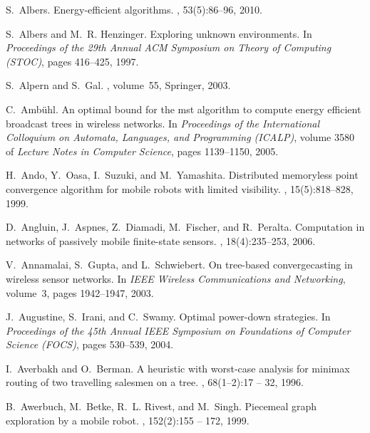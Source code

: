 \documentclass{article}
\begin{document}
\begin{thebibliography}{10}

S.~Albers.
\newblock Energy-efficient algorithms.
, 53(5):86--96, 2010.

S.~Albers and M.~R. Henzinger.
\newblock Exploring unknown environments.
\newblock In {\em Proceedings of the 29th Annual ACM Symposium on
  Theory of Computing (STOC)}, pages 416--425, 1997.

S.~Alpern and S.~Gal.
, volume~55,
\newblock Springer, 2003.

C.~Ambühl.
\newblock An optimal bound for the mst algorithm to compute energy efficient
  broadcast trees in wireless networks.
\newblock In {\em Proceedings of the International Colloquium on Automata, Languages, and
  Programming (ICALP)}, volume 3580 of {\em Lecture Notes in Computer Science},
  pages 1139--1150, 2005.

H.~Ando, Y.~Oasa, I.~Suzuki, and M.~Yamashita.
\newblock Distributed memoryless point convergence algorithm for mobile robots
  with limited visibility.
, 15(5):818--828,
  1999.

D.~Angluin, J.~Aspnes, Z.~Diamadi, M.~Fischer, and R.~Peralta.
\newblock Computation in networks of passively mobile finite-state sensors.
, 18(4):235--253, 2006.

V.~Annamalai, S.~Gupta, and L.~Schwiebert.
\newblock On tree-based convergecasting in wireless sensor networks.
\newblock In {\em IEEE Wireless Communications and Networking}, volume~3, pages 1942--1947, 2003.

J.~Augustine, S.~Irani, and C.~Swamy.
\newblock Optimal power-down strategies.
\newblock In {\em Proceedings of the 45th
  Annual IEEE Symposium on Foundations of Computer Science (FOCS)}, pages 530--539, 2004.

I.~Averbakh and O.~Berman.
\newblock A heuristic with worst-case analysis for minimax routing of two
  travelling salesmen on a tree.
, 68(1–2):17 -- 32, 1996.

B.~Awerbuch, M.~Betke, R.~L. Rivest, and M.~Singh.
\newblock Piecemeal graph exploration by a mobile robot.
, 152(2):155 -- 172, 1999.


\end{thebibliography}
\end{document}
